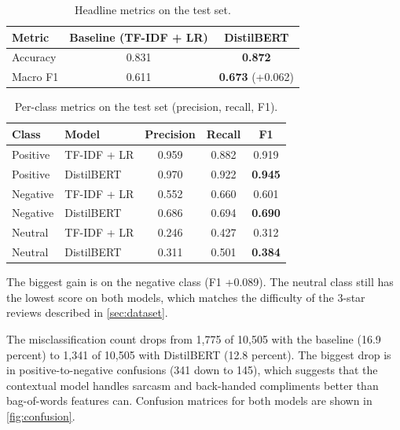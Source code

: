 \documentclass[12pt,a4paper]{report}
\begin{document}
\begin{table}[ht!]
  \centering
  \caption{Headline metrics on the test set.}
  \label{tab:headline}
  \begin{tabular}{@{}lcc@{}}
    \toprule
    Metric & Baseline (TF-IDF + LR) & DistilBERT \\
    \midrule
    Accuracy   & 0.831 & \textbf{0.872} \\
    Macro F1   & 0.611 & \textbf{0.673} (+0.062) \\
    \bottomrule
  \end{tabular}
\end{table}

\begin{table}[ht!]
  \centering
  \caption{Per-class metrics on the test set (precision, recall, F1).}
  \label{tab:perclass}
  \begin{tabular}{@{}llccc@{}}
    \toprule
    Class & Model & Precision & Recall & F1 \\
    \midrule
    Positive & TF-IDF + LR & 0.959 & 0.882 & 0.919 \\
    Positive & DistilBERT  & 0.970 & 0.922 & \textbf{0.945} \\
    \addlinespace
    Negative & TF-IDF + LR & 0.552 & 0.660 & 0.601 \\
    Negative & DistilBERT  & 0.686 & 0.694 & \textbf{0.690} \\
    \addlinespace
    Neutral  & TF-IDF + LR & 0.246 & 0.427 & 0.312 \\
    Neutral  & DistilBERT  & 0.311 & 0.501 & \textbf{0.384} \\
    \bottomrule
  \end{tabular}
\end{table}

The biggest gain is on the negative class (F1 +0.089). The neutral class still has the lowest score on both models, which matches the difficulty of the 3-star reviews described in \cref{sec:dataset}.

The misclassification count drops from 1,775 of 10,505 with the baseline (16.9 percent) to 1,341 of 10,505 with DistilBERT (12.8 percent). The biggest drop is in positive-to-negative confusions (341 down to 145), which suggests that the contextual model handles sarcasm and back-handed compliments better than bag-of-words features can. Confusion matrices for both models are shown in \cref{fig:confusion}.
\end{document}

